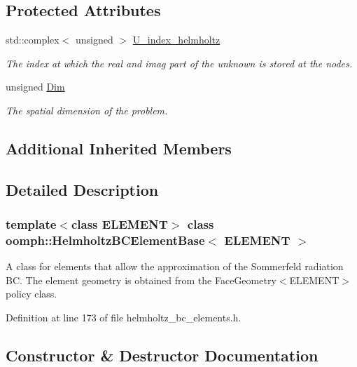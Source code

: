\subsection*{Protected Attributes}
\begin{DoxyCompactItemize}
\item 
std\+::complex$<$ unsigned $>$ \hyperlink{classoomph_1_1HelmholtzBCElementBase_ad3e6d12158c24f428c295bd5ad54365e}{U\+\_\+index\+\_\+helmholtz}
\begin{DoxyCompactList}\small\item\em The index at which the real and imag part of the unknown is stored at the nodes. \end{DoxyCompactList}\item 
unsigned \hyperlink{classoomph_1_1HelmholtzBCElementBase_ad01f0d13e7319e28f28286abb6d0b7cc}{Dim}
\begin{DoxyCompactList}\small\item\em The spatial dimension of the problem. \end{DoxyCompactList}\end{DoxyCompactItemize}
\subsection*{Additional Inherited Members}


\subsection{Detailed Description}
\subsubsection*{template$<$class E\+L\+E\+M\+E\+NT$>$\newline
class oomph\+::\+Helmholtz\+B\+C\+Element\+Base$<$ E\+L\+E\+M\+E\+N\+T $>$}

A class for elements that allow the approximation of the Sommerfeld radiation BC. The element geometry is obtained from the Face\+Geometry$<$\+E\+L\+E\+M\+E\+N\+T$>$ policy class. 

Definition at line 173 of file helmholtz\+\_\+bc\+\_\+elements.\+h.



\subsection{Constructor \& Destructor Documentation}
\mbox{\label{classoomph_1_1HelmholtzBCElementBase_a3d3dae6a01616db735b2624f5a06bdd5}} 
